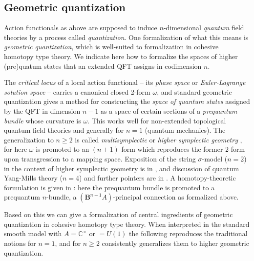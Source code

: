 \documentclass[copyright,12pt]{eptcs}
\begin{document}
\subsection{Geometric quantization}
\label{GeometricQuantization}

Action functionals as above are supposed to induce $n$-dimensional \emph{quantum} field theories
by a process called \emph{quantization}. One formalization of what this means is
\emph{geometric quantization}, which is well-suited to formalization in
cohesive homotopy type theory. We indicate here how to formalize the spaces of
higher (pre)quatum states that an extended QFT assigns in codimension $n$.

The \emph{critical locus} of a
local action functional -- its \emph{phase space} or
\emph{Euler-Lagrange solution space} -- carries a canonical closed 2-form $\omega$,
and standard geometric quantization gives a method for constructing the
\emph{space of quantum states} assigned by the QFT in dimension $n-1$
as a space of certain sections of a
\emph{prequantum bundle} whose curvature is $\omega$.
This works well for non-extended topological quantum field theories and generally for
$n = 1$ (quantum mechanics). The generalization to $n \geq 2$ is
called \emph{multisymplectic} or \emph{higher symplectic geometry} \cite{CR},
for here $\omega$ is promoted to an $(n+1)$-form which reproduces the former 2-form
upon transgression to a mapping space. Exposition of the string $\sigma$-model
($n = 2$) in the context of higher symplectic geometry is in \cite{BHR},
and discussion of quantum Yang-Mills theory ($n = 4$)
and further pointers are in \cite{Kan}.
A homotopy-theoretic formulation is given in \cite{SchreiberErlangen}: here the prequantum
bundle is promoted to a prequantum $n$-bundle, a $(\mathbf{B}^{n-1}A)$-principal connection
as formalized above.

Based on this we can give a formalization of central ingredients of geometric quantization in
cohesive homotopy type theory. When interpreted in the standard smooth model with $A = \mathbb{C}^\times$ or $= U(1)$ the following reproduces the traditional notions for $n = 1$, and for $n \geq 2$ consistently generalizes them to higher
geometric quantization.
\end{document}

